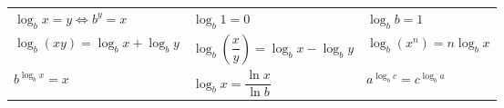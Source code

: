 \begin{center}
\renewcommand{\arraystretch}{2.2}\setlength{\tabcolsep}{10pt}
\begin{tabular}{lll}
	$\log_b x = y \iff b^y = x$ & $\log_b 1 = 0$ & $\log_b b = 1$ \\
	$\log_b(xy) = \log_b x + \log_b y$ & $\log_b\left(\dfrac{x}{y}\right) = \log_b x - \log_b y$ & $\log_b(x^n) = n \log_b x$ \\
	$b^{\log_b x} = x$ & $\log_b x = \dfrac{\ln x}{\ln b}$ & $a^{\log_b c} = c^{\log_b a}$ \\
\end{tabular}
\end{center}
